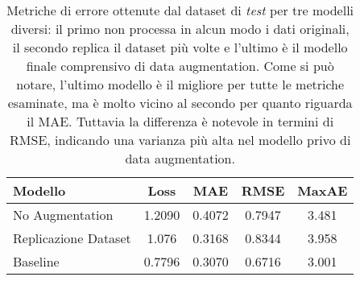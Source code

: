 \begin{table}[tbp]
  \centering
  \begin{tabular}{lcccc}
    \toprule
    Modello         &  Loss  &  MAE   &  RMSE  & MaxAE \\
    \midrule
    No Augmentation & 1.2090 & 0.4072 & 0.7947 & 3.481 \\
    Replicazione Dataset & 1.076 & 0.3168 & 0.8344 & 3.958 \\
    Baseline        & 0.7796 & 0.3070 & 0.6716 & 3.001 \\
    \bottomrule
  \end{tabular}
  \caption{Metriche di errore ottenute dal dataset di \emph{test} per tre
    modelli diversi: il primo non processa in alcun modo i dati originali,
    il secondo replica il dataset più volte e l'ultimo è il modello finale
    comprensivo di data augmentation. Come si può notare, l'ultimo modello è il
    migliore per tutte le metriche esaminate, ma è molto vicino al secondo per
    quanto riguarda il MAE\@. Tuttavia la differenza è notevole in termini di
    RMSE, indicando una varianza più alta nel modello privo di data
    augmentation.}%
  \label{tab:noaugment}%
\end{table}
